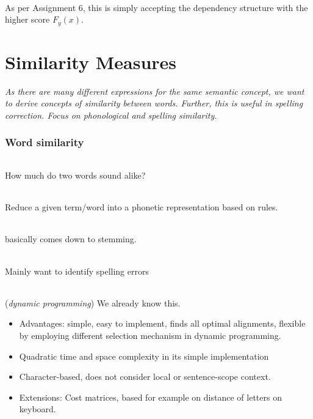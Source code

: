 \documentclass[10pt,twocolumn]{article}
\begin{document}
\paragraph{ } As per Assignment 6, this is simply
accepting the dependency structure with the higher score $F_y(x)$.


\pagebreak
\part{Similarity Measures}

\textit{As there are many different expressions for the same semantic concept,
  we want to derive concepts of similarity between words. Further, this is
  useful in spelling correction. Focus on phonological and spelling similarity.}

\section{Word similarity}

\paragraph{} How much do two words sound alike?

\paragraph{ } Reduce a given term/word into a phonetic
representation based on rules.

\paragraph{} basically comes down to stemming.

\paragraph{} Mainly want to identify spelling errors

\paragraph{} (\textit{dynamic
  programming}) We already know this.
\begin{itemize}
\item Advantages: simple, easy to implement, finds all optimal alignments,
  flexible by employing different selection mechanism in dynamic programming.
\item Quadratic time and space complexity in its simple implementation
\item Character-based, does not consider local or sentence-scope context.
\item Extensions: Cost matrices, based for example on distance of letters on
  keyboard.
\end{itemize}
\end{document}
